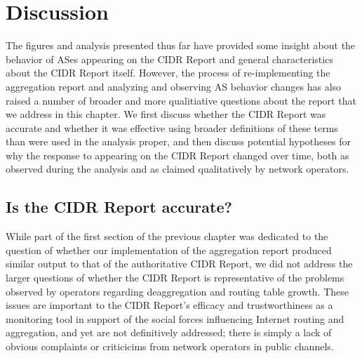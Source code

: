 \chapter{Discussion}
\label{chap:discussion}

%

The figures and analysis presented thus far have provided some insight about
the behavior of ASes appearing on the CIDR Report and general characteristics
about the CIDR Report itself. However, the process of re-implementing the
aggregation report and analyzing and observing AS behavior changes has also
raised a number of broader and more qualitiative questions about the report
that we address in this chapter. We first discuss whether the CIDR Report was
accurate and whether it was effective using broader definitions of these terms
than were used in the analysis proper, and then discuss potential hypotheses
for why the response to appearing on the CIDR Report changed over time, both as
observed during the analysis and as claimed qualitatively by network operators.

\section{Is the CIDR Report accurate?}
While part of the first section of the previous chapter was dedicated to the
question of whether our implementation of the aggregation report produced
similar output to that of the authoritative CIDR Report, we did not address the
larger questions of whether the CIDR Report is representative of the problems
observed by operators regarding deaggregation and routing table growth. These
issues are important to the CIDR Report's efficacy and trustworthiness as a
monitoring tool in support of the social forces influencing Internet routing
and aggregation, and yet are not definitively addressed; there is simply a lack
of obvious complaints or criticicims from network operators in public channels.

